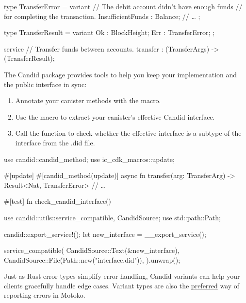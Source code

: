 \documentclass{article}
\begin{document}
\begin{code}[good]
type TransferError = variant {
  // The debit account didn't have enough funds
  // for completing the transaction.
  InsufficientFunds : Balance;
  // \ldots
};

type TransferResult =
  variant { Ok : BlockHeight; Err : TransferError; };

service {
  // Transfer funds between accounts.
  transfer : (TransferArgs) -> (TransferResult);
}
\end{code}

The Candid package provides tools to help you keep your implementation and the public interface in sync:

\begin{enumerate}
\item 
  Annotate your canister methods with the \href{https://docs.rs/candid/0.8.2/candid/attr.candid_method.html}{} macro.
\item 
  Use the \href{https://docs.rs/candid/0.8.2/candid/macro.export_service.html}{} macro to extract your canister's effective Candid interface.
\item 
  Call the \href{https://docs.rs/candid/0.8.2/candid/utils/fn.service_compatible.html}{} function to check whether the effective interface is a subtype of the interface from the .did file.
\end{enumerate}

\begin{code}[good]
use candid::candid_method;
use ic_cdk_macros::update;

#[update]
#[candid_method(update)] 
async fn transfer(arg: TransferArg) -> Result<Nat, TransferError> {
  // \ldots
}

#[test]
fn check_candid_interface() {
  use candid::utils::{service_compatible, CandidSource};
  use std::path::Path;

  candid::export_service!(); 
  let new_interface = __export_service();

  service_compatible( 
    CandidSource::Text(&new_interface),
    CandidSource::File(Path::new("interface.did")),
  ).unwrap();
}
\end{code}


Just as Rust error types simplify error handling, Candid variants can help your clients gracefully handle edge cases.
Variant types are also the \href{https://sdk.dfinity.org/docs/language-guide/errors.html#_prefer_optionresult_over_exceptions_where_possible}{preferred} way of reporting errors in Motoko.
\end{document}
